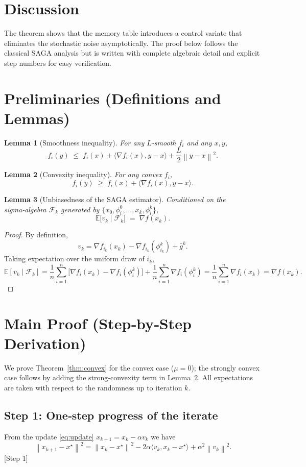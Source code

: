 \documentclass{article}
\newtheorem{lemma}{Lemma}
\newcommand{\E}{\mathbb{E}}
\newcommand{\norm}[1]{\left\|#1\right\|}
\newcommand{\grad}{\nabla}
\begin{document}
\section*{Discussion}
The theorem shows that the memory table introduces a control variate that
eliminates the stochastic noise asymptotically. The proof below follows the
classical SAGA analysis but is written with complete algebraic detail and
explicit step numbers for easy verification.

\newpage
\section*{Preliminaries (Definitions and Lemmas)}
\begin{lemma}[Smoothness inequality]\label{lem:smooth}
For any $L$‑smooth $f_i$ and any $x,y$,
\[
f_i(y) \;\le\; f_i(x) +\langle \grad f_i(x),y-x\rangle
          +\frac{L}{2}\norm{y-x}^{2}.
\]
\end{lemma}
\begin{lemma}[Convexity inequality]\label{lem:convex}
For any convex $f_i$,
\[
f_i(y) \;\ge\; f_i(x) +\langle \grad f_i(x),y-x\rangle .
\]
\end{lemma}
\begin{lemma}[Unbiasedness of the SAGA estimator]\label{lem:unbiased}
Conditioned on the sigma‑algebra $\mathcal{F}_k$ generated by
$\{x_0,\phi_i^0,\dots,x_k,\phi_i^k\}$,
\[
\E\!\bigl[ v_k \mid \mathcal{F}_k \bigr] \;=\; \grad f(x_k).
\]
\end{lemma}
\begin{proof}
By definition,
\[
v_k = \grad f_{i_k}(x_k)-\grad f_{i_k}(\phi_{i_k}^k)+\bar g^k .
\]
Taking expectation over the uniform draw of $i_k$,
\[
\E[ v_k\mid\mathcal{F}_k]
 = \frac1n\sum_{i=1}^{n}\bigl[\grad f_i(x_k)-\grad f_i(\phi_i^k)\bigr]
   +\frac1n\sum_{i=1}^{n}\grad f_i(\phi_i^k)
 = \frac1n\sum_{i=1}^{n}\grad f_i(x_k) = \grad f(x_k).
\]
\end{proof}

\section*{Main Proof (Step‑by‑Step Derivation)}
We prove Theorem~\ref{thm:convex} for the convex case ($\mu=0$); the strongly
convex case follows by adding the strong‑convexity term in Lemma~\ref{lem:convex}.
All expectations are taken with respect to the randomness up to iteration $k$.

\subsection*{Step 1: One‑step progress of the iterate}
From the update \eqref{eq:update} $x_{k+1}=x_k-\alpha v_k$ we have
\[
\norm{x_{k+1}-x^\star}^{2}
 = \norm{x_k-x^\star}^{2}
   -2\alpha\langle v_k, x_k-x^\star\rangle
   +\alpha^{2}\norm{v_k}^{2}. \tag{2}
\]
[Step 1]
\end{document}
